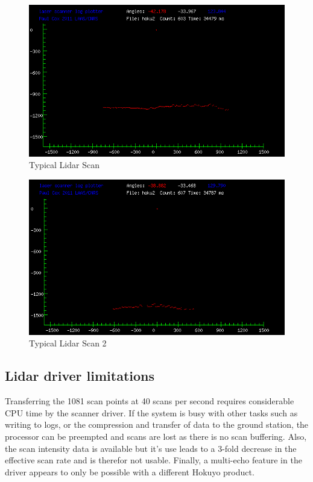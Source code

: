 \documentclass[a4paper,11pt]{report}
\begin{document}
\begin{figure}[ht]
 \centering
 \includegraphics[width=12cm]{scan603.png}
 \caption{Typical Lidar Scan}
 \label{fig:lidar_scan1}
\end{figure}

\begin{figure}[ht]
 \centering
 \includegraphics[width=12cm]{scan607.png}
 \caption{Typical Lidar Scan 2}
 \label{fig:lidar_scan2}
\end{figure}

\subsection{Lidar driver limitations}

Transferring the 1081 scan points at 40 scans per second requires considerable CPU time by the scanner driver. If the system is busy with other tasks such as writing to logs, or the compression and transfer of data to the ground station, the processor can be preempted and scans are lost as there is no scan buffering. Also, the scan intensity data is available but it's use leads to a 3-fold decrease in the effective scan rate and is therefor not usable. Finally, a multi-echo feature in the driver appears to only be possible with a different Hokuyo product.
\end{document}
